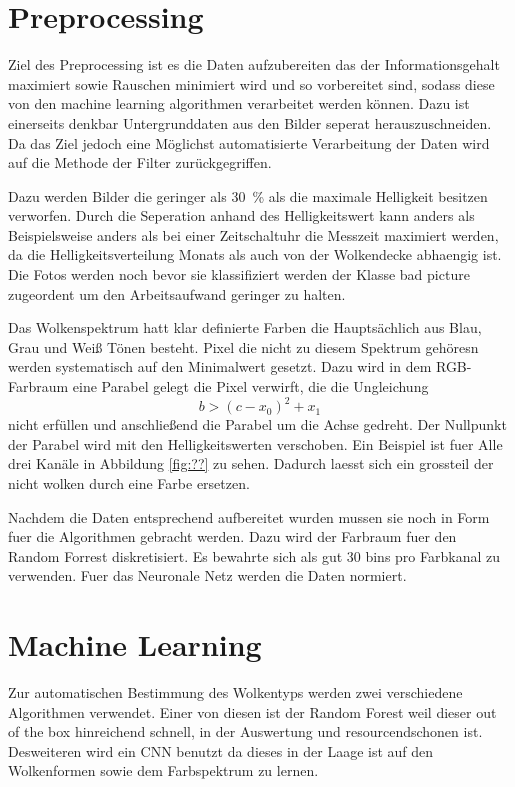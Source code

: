 \section{Preprocessing}
\label{sec:03_Preprocessing}
Ziel des Preprocessing ist es die Daten aufzubereiten das der
Informationsgehalt maximiert sowie Rauschen minimiert wird und so vorbereitet 
sind, sodass diese von den machine learning algorithmen verarbeitet werden können. 
Dazu ist einerseits denkbar Untergrunddaten aus den Bilder seperat
herauszuschneiden.
Da das Ziel jedoch eine Möglichst automatisierte Verarbeitung der Daten wird auf
die Methode der Filter zurückgegriffen.

Dazu werden Bilder die geringer als \SI{30}{\percent} als die maximale Helligkeit besitzen
verworfen. 
Durch die Seperation anhand des Helligkeitswert kann anders als Beispielsweise
anders als bei einer Zeitschaltuhr die Messzeit maximiert werden, da die
Helligkeitsverteilung Monats als auch von der Wolkendecke abhaengig ist.
Die Fotos werden noch bevor sie klassifiziert werden der Klasse bad picture
zugeordent um den Arbeitsaufwand geringer zu halten.

Das Wolkenspektrum hatt klar definierte Farben die Hauptsächlich aus Blau, Grau
und Weiß Tönen besteht. 
Pixel die nicht zu diesem Spektrum gehöresn werden systematisch auf den
Minimalwert gesetzt.
Dazu wird in dem RGB-Farbraum eine Parabel gelegt die Pixel verwirft, die die
Ungleichung 
\begin{equation}
		b > (c - x_0)^2 + x_1
\end{equation}
nicht erfüllen und anschließend die Parabel um die Achse gedreht.
Der Nullpunkt der Parabel wird mit den Helligkeitswerten verschoben.
Ein Beispiel ist fuer Alle  drei Kanäle in Abbildung \ref{fig:??} zu sehen.
Dadurch laesst sich ein grossteil der nicht wolken durch eine Farbe ersetzen.

Nachdem die Daten entsprechend aufbereitet wurden mussen sie noch in Form fuer
die Algorithmen gebracht werden. 
Dazu wird der Farbraum fuer den Random Forrest diskretisiert.
Es bewahrte sich als gut 30 bins pro Farbkanal zu verwenden.
Fuer das Neuronale Netz werden die Daten normiert.

\section{Machine Learning}

Zur automatischen Bestimmung des Wolkentyps werden zwei verschiedene Algorithmen
verwendet. 
Einer von diesen ist der Random Forest weil dieser out of the box hinreichend schnell,
in der Auswertung und resourcendschonen ist.
Desweiteren wird ein CNN benutzt da dieses in der Laage ist auf den Wolkenformen
sowie dem Farbspektrum zu lernen. 

